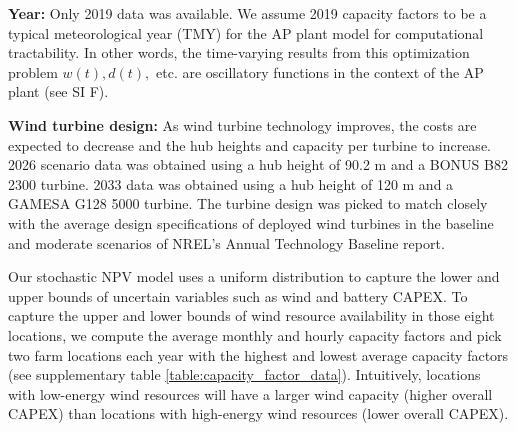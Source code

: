 \documentclass{article}
\begin{document}
\textbf{Year:} Only 2019 data was available. We assume 2019 capacity factors to be a typical meteorological year (TMY) for the AP plant model for computational tractability. In other words, the time-varying results from this optimization problem \( w(t), d(t), \) etc. are oscillatory functions in the context of the AP plant (see SI F).

\textbf{Wind turbine design:} As wind turbine technology improves, the costs are expected to decrease and the hub heights and capacity per turbine to increase. 2026 scenario data was obtained using a hub height of 90.2 m and a BONUS B82 2300 turbine. 2033 data was obtained using a hub height of 120 m and a GAMESA G128 5000 turbine. The turbine design was picked to match closely with the average design specifications of deployed wind turbines in the baseline and moderate scenarios of NREL’s Annual Technology Baseline report\cite{OEDI2022}.

Our stochastic NPV model uses a uniform distribution to capture the lower and upper bounds of uncertain variables such as wind and battery CAPEX. To capture the upper and lower bounds of wind resource availability in those eight locations, we compute the average monthly and hourly capacity factors and pick two farm locations each year with the highest and lowest average capacity factors (see supplementary table \ref{table:capacity_factor_data}). Intuitively, locations with low-energy wind resources will have a larger wind capacity (higher overall CAPEX) than locations with high-energy wind resources (lower overall CAPEX).
\end{document}
